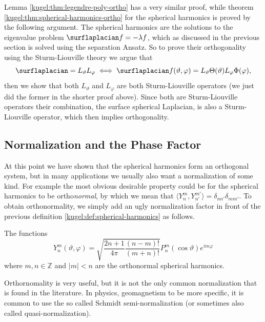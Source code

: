 Lemma \ref{kugel:thm:legendre-poly-ortho} has a very similar proof, while
theorem \ref{kugel:thm:spherical-harmonics-ortho} for the spherical harmonics is
proved by the following argument.  The spherical harmonics are the solutions to
the eigenvalue problem $\surflaplacian f = -\lambda f$, which as discussed in
the previous section is solved using the separation Ansatz. So to prove their
orthogonality using the Sturm-Liouville theory we argue that
\begin{equation*}
  \surflaplacian = L_\vartheta L_\varphi \iff
  \surflaplacian f(\vartheta, \varphi)
    = L_\vartheta \Theta(\vartheta) L_\varphi \Phi(\varphi),
\end{equation*}
then we show that both $L_\vartheta$ and $L_\varphi$ are both Sturm-Liouville
operators (we just did the former in the shorter proof above). Since both are
Sturm-Liouville operators their combination, the surface spherical Laplacian, is
also a Sturm-Liouville operator, which then implies orthogonality.

\subsection{Normalization and the Phase Factor}

At this point we have shown that the spherical harmonics form an orthogonal
system, but in many applications we usually also want a normalization of some
kind. For example the most obvious desirable property could be for the spherical
harmonics to be ortho\emph{normal}, by which we mean that $\langle Y^m_n,
Y^{m'}_{n'} \rangle = \delta_{nn'} \delta_{mm'}$. To obtain orthonormality, we
simply add an ugly normalization factor in front of the previous definition
\ref{kugel:def:spherical-harmonics} as follows.

\begin{definition}
  \label{kugel:def:spherical-harmonics-orthonormal}
  The functions
  \begin{equation*}
    Y^m_n(\vartheta, \varphi)
    = \sqrt{\frac{2n + 1}{4\pi} \frac{(n-m)!}{(m+n)!}}
      P^m_n(\cos \vartheta) e^{im\varphi}
  \end{equation*}
  where $m, n \in \mathbb{Z}$ and $|m| < n$ are the orthonormal spherical
  harmonics.
\end{definition}

Orthornomality is very useful, but it is not the only common normalization that
is found in the literature. In physics, geomagnetism to be more specific, it is
common to use the so called Schmidt semi-normalization (or sometimes also called
quasi-normalization).

